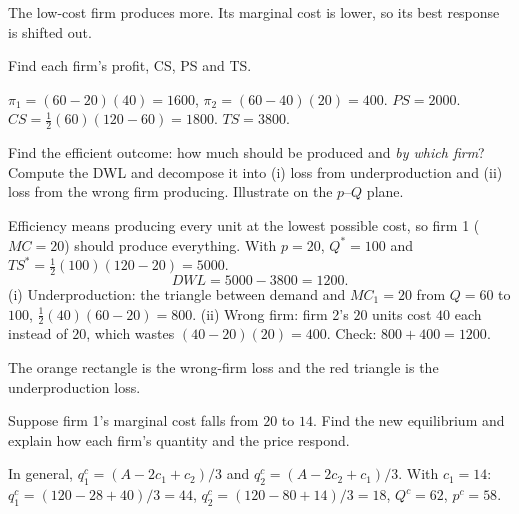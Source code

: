 \begin{description}
\begin{solution}
The low-cost firm produces more. Its marginal cost is lower, so its best response is shifted out.
\end{solution}
\item[4.4] Find each firm's profit, CS, PS and TS.
\begin{solution}
$\pi_1=(60-20)(40)=1600$, $\pi_2=(60-40)(20)=400$. $PS=2000$. $CS=\tfrac12(60)(120-60)=1800$. $TS=3800$.
\end{solution}
\item[4.5] Find the efficient outcome: how much should be produced and \emph{by which firm}? Compute the DWL and decompose it into (i) loss from underproduction and (ii) loss from the wrong firm producing. Illustrate on the $p$--$Q$ plane.
\begin{solution}
Efficiency means producing every unit at the lowest possible cost, so firm 1 ($MC=20$) should produce everything. With $p=20$, $Q^*=100$ and $TS^*=\tfrac12(100)(120-20)=5000$.
\[DWL=5000-3800=1200.\]
(i) Underproduction: the triangle between demand and $MC_1=20$ from $Q=60$ to $100$, $\tfrac12(40)(60-20)=800$.
(ii) Wrong firm: firm 2's $20$ units cost $40$ each instead of $20$, which wastes $(40-20)(20)=400$.
Check: $800+400=1200$.
\begin{center}
\end{center}
The orange rectangle is the wrong-firm loss and the red triangle is the underproduction loss.
\end{solution}
\item[4.6] Suppose firm 1's marginal cost falls from $20$ to $14$. Find the new equilibrium and explain how each firm's quantity and the price respond.
\begin{solution}
In general, $q_1^c=(A-2c_1+c_2)/3$ and $q_2^c=(A-2c_2+c_1)/3$. With $c_1=14$: $q_1^c=(120-28+40)/3=44$, $q_2^c=(120-80+14)/3=18$, $Q^c=62$, $p^c=58$.


\end{solution}
\end{description}
